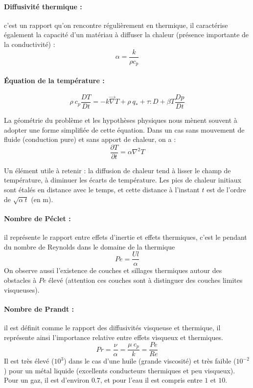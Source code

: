 \paragraph{Diffusivité thermique :}c'est un rapport qu'on rencontre régulièrement en thermique, il caractérise également la capacité d'un matériau à diffuser la chaleur (présence importante de la conductivité) :
%
\begin{equation}
\alpha = \frac{k}{\rho c_p}
\end{equation}


\paragraph{Équation de la température :}
%
\begin{equation}
\rho~c_p \frac{DT}{Dt}
= - k \vec{\nabla} T
+ \rho~q_*
+ \tau:D
+ \beta T\frac{Dp}{Dt}
\end{equation}

La géométrie du problème et les hypothèses physiques nous mènent souvent à adopter une forme simplifiée de cette équation. Dans un cas sans mouvement de fluide (conduction pure) et sans apport de chaleur, on a :
%
\begin{equation}
\frac{\partial T}{\partial t}
= \alpha \nabla^2 T
\end{equation}

Un élément utile à retenir : la diffusion de chaleur tend à lisser le champ de température, à diminuer les écarts de température. Les pics de chaleur initiaux sont étalés en distance avec le temps, et cette distance à l'instant $t$ est de l'ordre de $\sqrt{\alpha~t}$ (en m).


\paragraph{Nombre de Péclet :}il représente le rapport entre effets d'inertie et effets thermiques, c'est le pendant du nombre de Reynolds dans le domaine de la thermique
%
\begin{equation}
Pe=\frac{Ul}{\alpha}
\end{equation}
%
On observe aussi l'existence de couches et sillages thermiques autour des obstacles à $Pe$ élevé (attention ces couches sont à distinguer des couches limites visqueuses).

\paragraph{Nombre de Prandt :}il est définit comme le rapport des diffusivités visqueuse et thermique, il représente ainsi l'importance relative entre effets visqueux et thermiques.
%
\begin{equation}
Pr = \frac{\nu}{\alpha} = \frac{\mu~c_p}{k} = \frac{Pe}{Re}
\end{equation}
%
Il est très élevé ($10^3$) dans le cas d'une huile (grande viscosité) et très faible ($10^{-2}$) pour un métal liquide (excellents conducteurs thermiques et peu visqueux). Pour un gaz, il est d'environ $0.7$, et pour l'eau il est compris entre $1$ et $10$.

